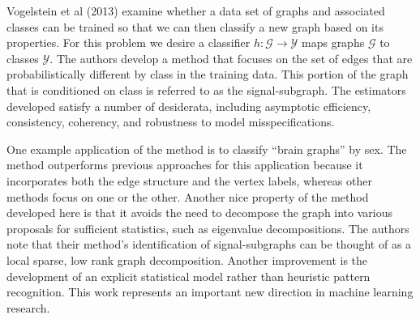 \documentclass[12pt,letterpaper]{article}
\begin{document}

Vogelstein et al (2013) examine whether a data set of graphs and associated classes can be trained so that we can then classify a new graph based on its properties. For this problem we desire a classifier $h: \mathcal{G} \rightarrow \mathcal{Y}$ maps graphs $\mathcal{G}$ to classes $\mathcal{Y}$. The authors develop a method that focuses on the set of edges that are probabilistically different by class in the training data. This portion of the graph that is conditioned on class is referred to as the signal-subgraph. The estimators developed satisfy a number of desiderata, including asymptotic efficiency, consistency, coherency, and robustness to model misspecifications. 

One example application of the method is to classify ``brain graphs'' by sex. The method outperforms previous approaches for this application because it incorporates both the edge structure and the vertex labels, whereas other methods focus on one or the other. Another nice property of the method developed here is that it avoids the need to decompose the graph into various proposals for sufficient statistics, such as eigenvalue decompositions. The authors note that their method's identification of signal-subgraphs can be thought of as a local sparse, low rank graph decomposition. Another improvement is the development of an explicit statistical model rather than heuristic pattern recognition. This work represents an important new direction in machine learning research.
\end{document}
